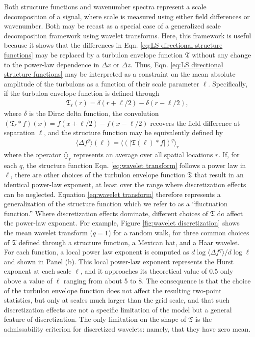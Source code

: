 \documentclass[acp, manuscript, english]{copernicus}
\begin{document}
Both structure functions and wavenumber spectra represent a scale decomposition of a signal, where scale is measured using either field differences or wavenumber. Both may be recast as a special case of a generalized scale decomposition framework using wavelet transforms. Here, this framework is useful because it shows that the differences in Eqn. \ref{eq:LS directional structure functions} may be replaced by a turbulon envelope function $\mathfrak{T}$ without any change to the power-law dependence in $\Delta x$ or $\Delta z$. Thus, Eqn. \ref{eq:LS directional structure functions} may be interpreted as a constraint on the mean absolute amplitude of the turbulons as a function of their scale parameter $\ell$. Specifically, if the turbulon envelope function is defined through
\begin{align}
  \mathfrak{T}_\ell(r) = \delta\left(r + \ell/2\right) - \delta\left(r - \ell/2\right), \label{eq:delta pair envelope}
\end{align}
where $\delta$ is the Dirac delta function, the convolution $(\mathfrak{T}_\ell * f)(x) = f(x + \ell/2) - f(x - \ell/2)$ recovers the field difference at separation $\ell$, and the structure function may be equivalently defined by
\begin{align}
\langle \Delta f^q\rangle(\ell) = \langle\left(\big|\mathfrak{T}(\ell) * f\big|\right)^q\rangle_r\label{eq:wavelet transform}
\end{align}
where the operator $\langle\rangle_r$ represents an average over all spatial locations $r$. If, for each $q$, the structure function Eqn. \ref{eq:wavelet transform} follows a power law in $\ell$, there are other choices of the turbulon envelope function $\mathfrak{T}$ that result in an identical power-law exponent, at least over the range where discretization effects can be neglected. Equation \ref{eq:wavelet transform} therefore represents a generalization of the structure function which we refer to as a ``fluctuation function.'' Where discretization effects dominate, different choices of $\mathfrak{T}$ do affect the power-law exponent. For example, Figure \ref{fig:wavelet discretization} shows the mean wavelet transform ($q=1$) for a random walk, for three common choices of $\mathfrak{T}$ defined through a structure function, a Mexican hat, and a Haar wavelet. For each function, a local power law exponent is computed as $d\log \langle \Delta f^q\rangle/d\log \ell$ and shown in Panel (b). This local power-law exponent represents the Hurst exponent at each scale $\ell$, and it approaches its theoretical value of 0.5 only above a value of $\ell$ ranging from about 5 to 8. The consequence is that the choice of the turbulon envelope function does not affect the resulting two-point statistics, but only at scales much larger than the grid scale, and that such discretization effects are not a specific limitation of the model but a general feature of discretization. The only limitation on the shape of $\mathfrak{T}$ is the admissability criterion for discretized wavelets: namely, that they have zero mean.
\end{document}
